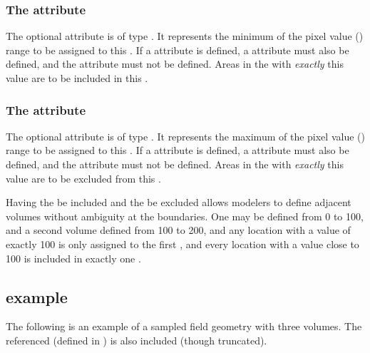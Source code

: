 \subsubsection{The \fixttspace{} attribute}
The optional  attribute is of type . It represents the minimum of the pixel value () range to be assigned to this \SampledVolume.  If a  attribute is defined, a  attribute must also be defined, and the  attribute must not be defined.  Areas in the \SampledField with \emph{exactly} this value are to be included in this \SampledVolume.

\subsubsection{The \fixttspace{} attribute}
The optional  attribute is of type . It represents the maximum of the pixel value () range to be assigned to this \SampledVolume.  If a  attribute is defined, a  attribute must also be defined, and the  attribute must not be defined.  Areas in the \SampledField with \emph{exactly} this value are to be excluded from this \SampledVolume.

Having the  be included and the  be excluded allows modelers to define adjacent volumes without ambiguity at the boundaries.  One \SampledVolume may be defined from 0 to 100, and a second volume defined from 100 to 200, and any location with a \SampledField value of exactly 100 is only assigned to the first \SampledVolume, and every location with a value close to 100 is included in exactly one \SampledVolume.


\subsection{ example}
\label{sampledfieldgeometry-example}
The following is an example of a sampled field geometry with three volumes.  The referenced \SampledField (defined in ) is also included (though truncated).

